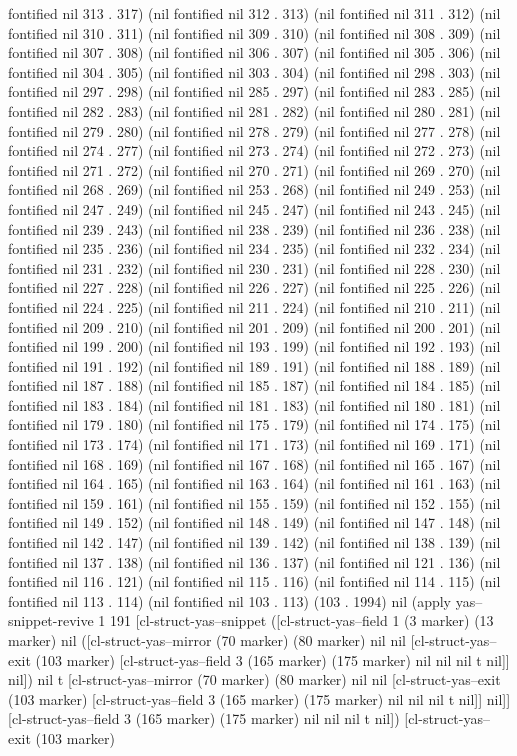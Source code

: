 fontified nil 313 . 317) (nil fontified nil 312 . 313) (nil fontified nil 311 . 312) (nil fontified nil 310 . 311) (nil fontified nil 309 . 310) (nil fontified nil 308 . 309) (nil fontified nil 307 . 308) (nil fontified nil 306 . 307) (nil fontified nil 305 . 306) (nil fontified nil 304 . 305) (nil fontified nil 303 . 304) (nil fontified nil 298 . 303) (nil fontified nil 297 . 298) (nil fontified nil 285 . 297) (nil fontified nil 283 . 285) (nil fontified nil 282 . 283) (nil fontified nil 281 . 282) (nil fontified nil 280 . 281) (nil fontified nil 279 . 280) (nil fontified nil 278 . 279) (nil fontified nil 277 . 278) (nil fontified nil 274 . 277) (nil fontified nil 273 . 274) (nil fontified nil 272 . 273) (nil fontified nil 271 . 272) (nil fontified nil 270 . 271) (nil fontified nil 269 . 270) (nil fontified nil 268 . 269) (nil fontified nil 253 . 268) (nil fontified nil 249 . 253) (nil fontified nil 247 . 249) (nil fontified nil 245 . 247) (nil fontified nil 243 . 245) (nil fontified nil 239 . 243) (nil fontified nil 238 . 239) (nil fontified nil 236 . 238) (nil fontified nil 235 . 236) (nil fontified nil 234 . 235) (nil fontified nil 232 . 234) (nil fontified nil 231 . 232) (nil fontified nil 230 . 231) (nil fontified nil 228 . 230) (nil fontified nil 227 . 228) (nil fontified nil 226 . 227) (nil fontified nil 225 . 226) (nil fontified nil 224 . 225) (nil fontified nil 211 . 224) (nil fontified nil 210 . 211) (nil fontified nil 209 . 210) (nil fontified nil 201 . 209) (nil fontified nil 200 . 201) (nil fontified nil 199 . 200) (nil fontified nil 193 . 199) (nil fontified nil 192 . 193) (nil fontified nil 191 . 192) (nil fontified nil 189 . 191) (nil fontified nil 188 . 189) (nil fontified nil 187 . 188) (nil fontified nil 185 . 187) (nil fontified nil 184 . 185) (nil fontified nil 183 . 184) (nil fontified nil 181 . 183) (nil fontified nil 180 . 181) (nil fontified nil 179 . 180) (nil fontified nil 175 . 179) (nil fontified nil 174 . 175) (nil fontified nil 173 . 174) (nil fontified nil 171 . 173) (nil fontified nil 169 . 171) (nil fontified nil 168 . 169) (nil fontified nil 167 . 168) (nil fontified nil 165 . 167) (nil fontified nil 164 . 165) (nil fontified nil 163 . 164) (nil fontified nil 161 . 163) (nil fontified nil 159 . 161) (nil fontified nil 155 . 159) (nil fontified nil 152 . 155) (nil fontified nil 149 . 152) (nil fontified nil 148 . 149) (nil fontified nil 147 . 148) (nil fontified nil 142 . 147) (nil fontified nil 139 . 142) (nil fontified nil 138 . 139) (nil fontified nil 137 . 138) (nil fontified nil 136 . 137) (nil fontified nil 121 . 136) (nil fontified nil 116 . 121) (nil fontified nil 115 . 116) (nil fontified nil 114 . 115) (nil fontified nil 113 . 114) (nil fontified nil 103 . 113) (103 . 1994) nil (apply yas--snippet-revive 1 191 [cl-struct-yas--snippet ([cl-struct-yas--field 1 (3 marker) (13 marker) nil ([cl-struct-yas--mirror (70 marker) (80 marker) nil nil [cl-struct-yas--exit (103 marker) [cl-struct-yas--field 3 (165 marker) (175 marker) nil nil nil t nil]] nil]) nil t [cl-struct-yas--mirror (70 marker) (80 marker) nil nil [cl-struct-yas--exit (103 marker) [cl-struct-yas--field 3 (165 marker) (175 marker) nil nil nil t nil]] nil]] [cl-struct-yas--field 3 (165 marker) (175 marker) nil nil nil t nil]) [cl-struct-yas--exit (103 marker) 